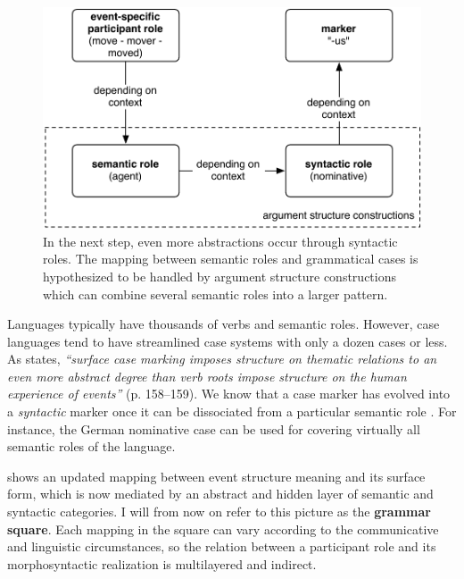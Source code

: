 \begin{figure}[t]
\centerline{\includegraphics[scale=0.6]{chap-introduction/figs/case-quadrant}}
  \caption[Formation of case markers: stage IV]{In the next step, even more abstractions occur through syntactic roles. The mapping between semantic roles and grammatical cases is hypothesized to be handled by argument structure constructions which can combine several semantic roles into a larger pattern.}
   \label{f:stage4}
\end{figure}

Languages typically have thousands of verbs and semantic roles. However, case languages tend to have streamlined case systems with only a dozen cases or less. As \citet{croft91syntactic} states, {\em ``surface case marking imposes structure on thematic relations to an even more abstract degree than verb roots impose structure on the human experience of events''} (p. 158--159). We know that a case marker has evolved into a {\em syntactic} marker once it can be dissociated from a particular semantic role \citep[2--3]{givon97introduction}. For instance, the German nominative case can be used for covering virtually all semantic roles of the language. 

 shows an updated mapping between event structure meaning and its surface form, which is now mediated by an abstract and hidden layer of semantic and syntactic categories. I will from now on refer to this picture as the {\bfseries grammar square}. Each mapping in the square can vary according to the communicative and linguistic circumstances, so the relation between a participant role and its morphosyntactic realization is multilayered and indirect.

